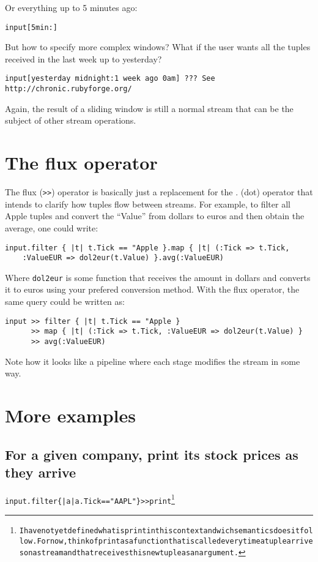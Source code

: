 \documentclass[twoside]{report}
\begin{document}
Or everything up to 5 minutes ago:

\begin{verbatim}
input[5min:]
\end{verbatim}


But how to specify more complex windows? What if the user wants all the tuples received in the last week up to yesterday?

\begin{verbatim}
input[yesterday midnight:1 week ago 0am] ??? See http://chronic.rubyforge.org/
\end{verbatim}


Again, the result of a sliding window is still a normal stream that can be the subject of other stream operations.

\section{The flux operator}

The flux (\verb=>>=) operator is basically just a replacement for the . (dot) operator that intends to clarify how tuples flow between streams. For example, to filter all Apple tuples and convert the ``Value'' from dollars to euros and then obtain the average, one could write:

\begin{verbatim}
input.filter { |t| t.Tick == "Apple }.map { |t| (:Tick => t.Tick,
    :ValueEUR => dol2eur(t.Value) }.avg(:ValueEUR)
\end{verbatim}

Where \verb=dol2eur= is some function that receives the amount in dollars and converts it to euros using your prefered conversion method. With the flux operator, the same query could be written as:

\begin{verbatim}
input >> filter { |t| t.Tick == "Apple }
      >> map { |t| (:Tick => t.Tick, :ValueEUR => dol2eur(t.Value) }
      >> avg(:ValueEUR)
\end{verbatim}

Note how it looks like a pipeline where each stage modifies the stream in some way.

\section{More examples}

\subsection{For a given company, print its stock prices as they arrive}
\begin{alltt}
input.filter \{ |a| a.Tick == "AAPL" \} >> print\footnote{I have not yet defined what is print in this context and wich semantics does it follow. For now, think of print as a function that is called everytime a tuple arrives on a stream and that receives this new tuple as an argument.}
\end{alltt}
\end{document}
